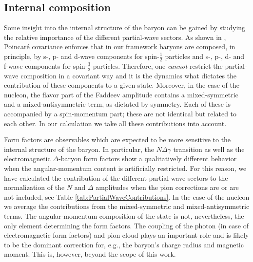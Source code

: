 \subsection{Internal composition}\label{subsec:internal_composition}

Some insight into the internal structure of the baryon can be gained by 
studying the relative importance of the different partial-wave sectors. 
As shown in \cite{Eichmann:2009qa,Eichmann:2009en,SanchisAlepuz:2011jn}, 
Poincar\'e covariance enforces that in our framework baryons are composed, 
in principle, by s-, p- and d-wave components for spin-$\frac{1}{2}$ 
particles and s-, p-, d- and f-wave components for spin-$\frac{3}{2}$
particles. Therefore, one \textit{cannot} restrict the partial-wave 
composition in a covariant way and it is the dynamics what 
dictates the contribution of these components to a given state. Moreover, 
in the case of the nucleon, the flavor part of the Faddeev amplitude contains 
a mixed-symmetric and a mixed-antisymmetric term, as dictated by symmetry. 
Each of these is accompanied by a spin-momentum part; these are not identical
but related to each other. In our calculation we take all these contributions
into account. 

Form factors are observables which are expected to be more sensitive to the internal structure of the baryon. In particular, the $N\Delta\gamma$ transition \cite{Eichmann:2011aa,NDg} as well as the electromagnetic $\Delta$-baryon form factors \cite{Sanchis-Alepuz:2013iia} show a qualitatively different behavior when the angular-momentum content is artificially restricted. For this reason, we have calculated the contribution of the different partial-wave sectors to the normalization of the $N$ and $\Delta$ amplitudes when the pion corrections are or are not included, see Table \ref{tab:PartialWaveContributions}. In the case of the nucleon we average the contributions from the mixed-symmetric and mixed-antisymmetric terms. The angular-momentum composition of the state is not, nevertheless, the only element determining the form factors. The coupling of the photon (in case of electromagnetic form factors) and pion cloud plays an important role and is likely to be the dominant correction for, e.g., the baryon's charge radius and magnetic moment. This is, however, beyond the scope of this work.

